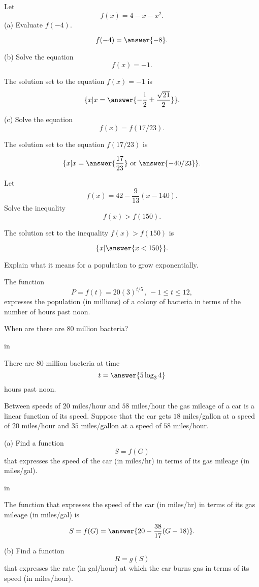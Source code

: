 \documentclass{ximera}
\newcommand{\pskip}{\vskip 0.1 in}
\begin{document}
\begin{question} \label{Qpdf0gbvgbrtg}
Let
\[
      f(x) = 4 - x - x^2 .
\]
(a) Evaluate $f(-4)$.

\[
    f(-4) = \answer{-8} .
\]

(b) Solve the equation 
\[
      f(x) = -1 .
\]

The solution set to the equation $f(x)=-1$ is
\[
  \{  x | x = \answer{-\frac{1}{2} \pm \frac{\sqrt{21}}{2}}  \}.
\]

(c) Solve the equation
\[
       f(x) = f(17/23) .
\]

The solution set to the equation $f(17/23)$ is

\[
   \{  x | x = \answer{\frac{17}{23}} \text{ or } \answer{-40/23}  \}.
\]

\end{question}


\begin{question}  \label{Qdfdcg4tythyh5t}
Let 
\[
       f(x) = 42 - \frac{9}{13}(x - 140) .
\]
Solve the inequality
\[
     f(x) > f(150) .
\]

The solution set to the inequality $f(x)>f(150)$ is

\[
    \{  x | \answer{x < 150}  \}.
\]

\end{question}


\begin{question}  \label{Eer5htrree}
Explain what it means for a population to grow exponentially.
\end{question}

\begin{question}
The function
\[
  P = f(t) = 20 (3)^{t/5} \, , \, -1 \leq t \leq 12 ,
\]
expresses the population (in millions) of a colony of bacteria in terms of the number of hours past noon. 

When are there are 80 million bacteria?

\pskip

There are 80 million bacteria at time
\[
 t = \answer{5 \log_3 4}
\]
hours past noon.
\end{question}


\begin{question}  \label{Q99834322}
Between speeds of $20$ miles/hour and $58$ miles/hour the gas mileage of a car is a linear function of its speed. Suppose that the car gets $18$ miles/gallon at a speed of $20$ miles/hour and $35$ miles/gallon at a speed of $58$ miles/hour.

(a) Find a function 
\[
       S = f(G)
\]
that expresses the speed of the car (in miles/hr) in terms of its gas mileage (in miles/gal).

\pskip

The function that expresses the speed of the car (in miles/hr) in terms of its gas mileage (in miles/gal) is
\[
      S = f(G) = \answer{20 - \frac{38}{17}(G-18)} .
\]

(b) Find a function 
\[
   R = g(S)
\]
that expresses the rate (in gal/hour) at which the car burns gas in terms of its speed (in miles/hour).

\end{question}
\end{document}
